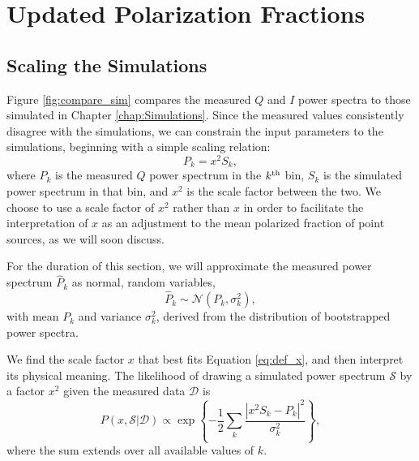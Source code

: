 \section{Updated Polarization Fractions}\label{sec:updates}

\subsection{Scaling the Simulations}

Figure \ref{fig:compare_sim} compares the measured $Q$ and $I$ power spectra to those simulated
in Chapter \ref{chap:Simulations}. Since the measured values consistently disagree with the
simulations, we can constrain the input parameters to the simulations, beginning with a simple
scaling relation:
\begin{equation}
  P_k = x^2S_k,
  \label{eq:def_x}
\end{equation}
where $P_k$ is the measured $Q$ 
power spectrum in the $k^{{\rm th}}$ bin,
$S_k$ is the simulated power spectrum in that bin, and
$x^2$ is the 
scale factor between the two. We choose to use a scale factor of $x^2$ rather than $x$ in order to
facilitate the interpretation of $x$ as an adjustment to the mean polarized fraction of point
sources, as we will soon discuss.

For the duration of this section, we will approximate the measured power spectrum $\hat{P}_k$ as
normal, random variables, 
\begin{equation}
  \hat{P}_k \sim \mathcal{N}(P_k, \sigma_k^2),
\end{equation}
with mean $P_k$ and variance $\sigma_k^2$, derived from the distribution of bootstrapped power
spectra.

We find the scale factor $x$ that best fits Equation \ref{eq:def_x}, and then interpret its physical
meaning. The likelihood of drawing a simulated power spectrum
$\mathcal{S}$ by
a factor $x^2$ given the measured data
$\mathcal{D}$ is 
\begin{equation}
  P(x,\mathcal{S}|\mathcal{D}) 
  \propto \exp\left\{-\frac{1}{2}\sum_k\frac{|x^2S_k - P_k|^2}{\sigma_k^2}\right\},
\end{equation}
where the sum extends over all available values of $k$.

